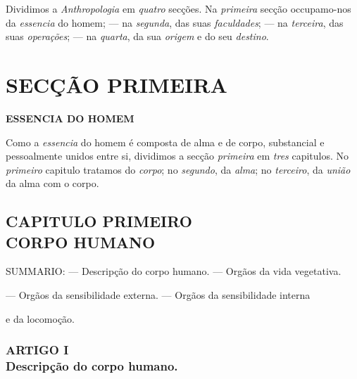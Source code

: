 
 
Dividimos a \emph{Anthropologia} em \emph{quatro} secções. Na \emph{primeira} secção occupamo-nos da \emph{essencia} do homem; --- na \emph{segunda}, das suas \emph{faculdades}; --- na \emph{terceira}, das suas \emph{operações}; --- na \emph{quarta}, da sua \emph{origem} e do seu \emph{destino}.

\part*{SECÇÃO PRIMEIRA}

 \textbf{ESSENCIA DO HOMEM}


Como a \emph{essencia} do homem é composta de alma e de corpo, substancial e pessoalmente unidos entre si, dividimos a secção \emph{primeira} em \emph{tres} capitulos. No \emph{primeiro} capitulo tratamos do \emph{corpo}; no \emph{segundo}, da \emph{alma}; no \emph{terceiro}, da \emph{união} da alma com o corpo.


\chapter*{CAPITULO PRIMEIRO\\[0.3em]\large CORPO HUMANO}

\textsc{SUMMARIO}: --- Descripção do corpo humano. --- Orgãos da vida vegetativa.

--- Orgãos da sensibilidade externa. --- Orgãos da sensibilidade interna

e da locomoção.


\section*{ARTIGO I\\ Descripção do corpo humano.}


